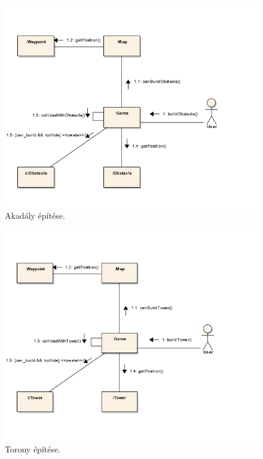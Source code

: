 \begin{figure}[H]
\begin{center}
\includegraphics{images/ch05/buildObKomm.png}
\caption{Akadály építése.}
\label{fig:buildObKomm}
\end{center}
\end{figure}

\begin{figure}[H]
\begin{center}
\includegraphics{images/ch05/buildTowerKomm.png}
\caption{Torony építése.}
\label{fig:buildTowerKomm}
\end{center}
\end{figure}

